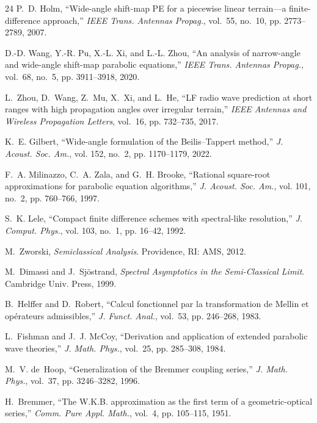 \documentclass[11pt]{article}
\begin{document}
\begin{thebibliography}{24}
P.~D. Holm, ``Wide-angle shift-map {PE} for a piecewise linear terrain---a
  finite-difference approach,'' \emph{IEEE Trans. Antennas Propag.}, vol.~55,
  no.~10, pp. 2773--2789, 2007.

D.-D. Wang, Y.-R. Pu, X.-L. Xi, and L.-L. Zhou, ``An analysis of narrow-angle
  and wide-angle shift-map parabolic equations,'' \emph{IEEE Trans. Antennas
  Propag.}, vol.~68, no.~5, pp. 3911--3918, 2020.

L.~Zhou, D.~Wang, Z.~Mu, X.~Xi, and L.~He, ``{LF} radio wave prediction at
  short ranges with high propagation angles over irregular terrain,''
  \emph{IEEE Antennas and Wireless Propagation Letters}, vol.~16,
  pp. 732--735, 2017.

K.~E. Gilbert, ``Wide-angle formulation of the {Beilis--Tappert} method,''
  \emph{J. Acoust. Soc. Am.}, vol. 152, no.~2, pp. 1170--1179, 2022.

F.~A. Milinazzo, C.~A. Zala, and G.~H. Brooke, ``Rational square-root
  approximations for parabolic equation algorithms,'' \emph{J. Acoust. Soc.
  Am.}, vol. 101, no.~2, pp. 760--766, 1997.

S.~K. Lele, ``Compact finite difference schemes with spectral-like
  resolution,'' \emph{J. Comput. Phys.}, vol. 103, no.~1, pp. 16--42, 1992.

M.~Zworski, \emph{Semiclassical Analysis}. Providence, RI: AMS, 2012.

M.~Dimassi and J.~Sj\"ostrand, \emph{Spectral Asymptotics in the
  Semi-Classical Limit}. Cambridge Univ. Press, 1999.

B.~Helffer and D.~Robert, ``Calcul fonctionnel par la transformation de
  Mellin et op\'erateurs admissibles,'' \emph{J. Funct. Anal.}, vol.~53,
  pp. 246--268, 1983.

L.~Fishman and J.~J. McCoy, ``Derivation and application of extended parabolic
  wave theories,'' \emph{J. Math. Phys.}, vol.~25, pp. 285--308, 1984.

M.~V. de~Hoop, ``Generalization of the Bremmer coupling series,'' \emph{J.
  Math. Phys.}, vol.~37, pp. 3246--3282, 1996.

H.~Bremmer, ``The W.K.B. approximation as the first term of a geometric-optical
  series,'' \emph{Comm. Pure Appl. Math.}, vol.~4, pp. 105--115, 1951.


\end{thebibliography}
\end{document}

